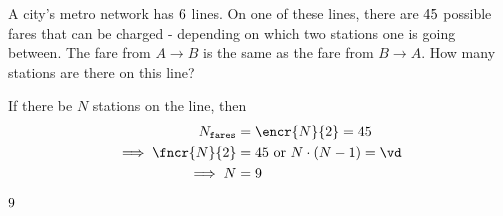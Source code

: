 



\MULTIPLY{}\vd

\question[2] A city's metro network has $6$ lines. On one of these lines, there are $45$ 
possible fares that can be charged - depending on which two stations one is going between.
The fare from $A\to B$ is the same as the fare from $B\to A$.
 How many stations are there on this line? 

\watchout

\begin{solution}[\mcq]
   If there be $N$ stations on the line, then
   \begin{align}
   		N_{\texttt{fares}} &= \encr{N}{2} = \vb \\
   		\implies \fncr{N}{2} &= \vb \text{ or } N\cdot(N-1) = \vd \\
   		\implies N &= \vc
   \end{align}
\end{solution}

\ifprintanswers
  \begin{codex}
    $9$
  \end{codex}
\fi 

